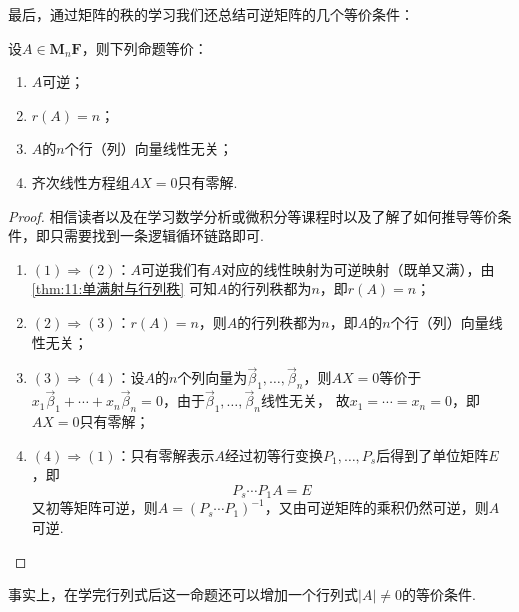 最后，通过矩阵的秩的学习我们还总结可逆矩阵的几个等价条件：
\begin{theorem}
    设$A \in \mathbf{M}_n{\mathbf{F}}$，则下列命题等价：
    \begin{enumerate}
        \item $A$可逆；

        \item $r(A)=n$；

        \item $A$的$n$个行（列）向量线性无关；

        \item 齐次线性方程组$AX=0$只有零解.
    \end{enumerate}
\end{theorem}
\begin{proof}
    相信读者以及在学习数学分析或微积分等课程时以及了解了如何推导等价条件，即只需要找到一条逻辑循环链路即可.
    \begin{enumerate}
        \item $(1)\Rightarrow(2)$：$A$可逆我们有$A$对应的线性映射为可逆映射（既单又满），由\autoref{thm:11:单满射与行列秩}
        可知$A$的行列秩都为$n$，即$r(A)=n$；
        \item $(2)\Rightarrow(3)$：$r(A)=n$，则$A$的行列秩都为$n$，即$A$的$n$个行（列）向量线性无关；
        \item $(3)\Rightarrow(4)$：设$A$的$n$个列向量为$\vec{\beta}_1,\ldots,\vec{\beta}_n$，则$AX=0$等价于
        $x_1\vec{\beta}_1+\cdots+x_n\vec{\beta}_n=0$，由于$\vec{\beta}_1,\ldots,\vec{\beta}_n$线性无关，
        故$x_1=\cdots=x_n=0$，即$AX=0$只有零解；
        \item $(4)\Rightarrow(1)$：只有零解表示$A$经过初等行变换$P_1,\ldots,P_s$后得到了单位矩阵$E$，即
        \[P_s\cdots P_1A=E\]
        又初等矩阵可逆，则$A=(P_s\cdots P_1)^{-1}$，又由可逆矩阵的乘积仍然可逆，则$A$可逆.
    \end{enumerate}
\end{proof}

事实上，在学完行列式后这一命题还可以增加一个行列式$|A|\neq 0$的等价条件.

